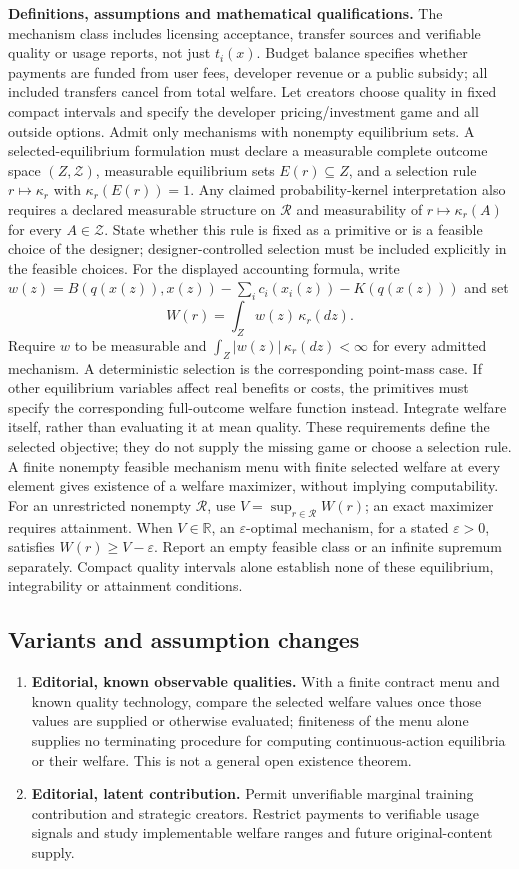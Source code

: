 \documentclass[11pt,a4paper]{article}
\newcommand{\R}{\mathbb R}
\begin{document}
\textbf{Definitions, assumptions and mathematical qualifications.} The mechanism class includes licensing acceptance, transfer sources and verifiable quality or usage reports, not just \(t_i(x)\). Budget balance specifies whether payments are funded from user fees, developer revenue or a public subsidy; all included transfers cancel from total welfare. Let creators choose quality in fixed compact intervals and specify the developer pricing/investment game and all outside options. Admit only mechanisms with nonempty equilibrium sets. A selected-equilibrium formulation must declare a measurable complete outcome space \((Z,\mathcal Z)\), measurable equilibrium sets \(E(r)\subseteq Z\), and a selection rule \(r\mapsto\kappa_r\) with \(\kappa_r(E(r))=1\). Any claimed probability-kernel interpretation also requires a declared measurable structure on \(\mathcal R\) and measurability of \(r\mapsto\kappa_r(A)\) for every \(A\in\mathcal Z\). State whether this rule is fixed as a primitive or is a feasible choice of the designer; designer-controlled selection must be included explicitly in the feasible choices. For the displayed accounting formula, write \(w(z)=B(q(x(z)),x(z))-\sum_i c_i(x_i(z))-K(q(x(z)))\) and set
\[
 W(r)=\int_Z w(z)\,\kappa_r(dz).
\]
Require \(w\) to be measurable and \(\int_Z|w(z)|\,\kappa_r(dz)<\infty\) for every admitted mechanism. A deterministic selection is the corresponding point-mass case. If other equilibrium variables affect real benefits or costs, the primitives must specify the corresponding full-outcome welfare function instead. Integrate welfare itself, rather than evaluating it at mean quality. These requirements define the selected objective; they do not supply the missing game or choose a selection rule. A finite nonempty feasible mechanism menu with finite selected welfare at every element gives existence of a welfare maximizer, without implying computability. For an unrestricted nonempty \(\mathcal R\), use \(V=\sup_{r\in\mathcal R}W(r)\); an exact maximizer requires attainment. When \(V\in\R\), an \(\varepsilon\)-optimal mechanism, for a stated \(\varepsilon>0\), satisfies \(W(r)\geq V-\varepsilon\). Report an empty feasible class or an infinite supremum separately. Compact quality intervals alone establish none of these equilibrium, integrability or attainment conditions.
\subsection*{Variants and assumption changes}
\begin{enumerate}
\item \textbf{Editorial, known observable qualities.} With a finite contract menu and known quality technology, compare the selected welfare values once those values are supplied or otherwise evaluated; finiteness of the menu alone supplies no terminating procedure for computing continuous-action equilibria or their welfare. This is not a general open existence theorem.
\item \textbf{Editorial, latent contribution.} Permit unverifiable marginal training contribution and strategic creators. Restrict payments to verifiable usage signals and study implementable welfare ranges and future original-content supply.
\end{enumerate}
\end{document}
